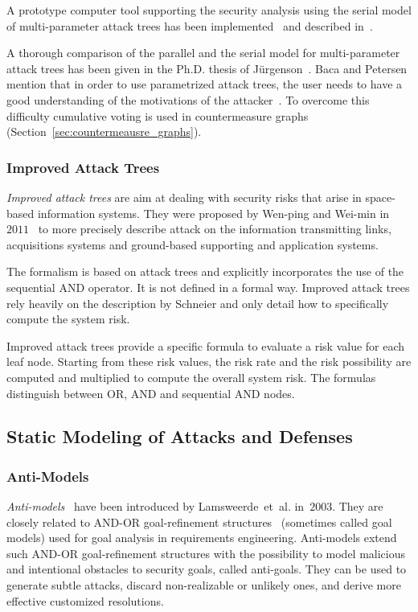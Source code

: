 \documentclass[a4paper]{article}
\begin{document}
A prototype computer tool supporting the security analysis using the serial
model of multi-parameter attack trees has been implemented~\cite{Program4} and
described in~\cite{AndrusenkoMaster}.

A thorough comparison of the parallel and the serial model for multi-parameter
attack trees has been given in the Ph.D. thesis of J\"{u}rgenson~\cite{Jurg}.
Baca and Petersen mention that in order to use parametrized attack trees, the 
user needs to have a good understanding of the motivations of the 
attacker~\cite{BaPe}. To overcome this difficulty cumulative voting is used in 
countermeasure graphs (Section~\ref{sec:countermeausre_graphs}).


\subsubsection{Improved Attack Trees} 
\label{sec:improved_attack_trees}

\emph{Improved attack trees} are aim at dealing with security risks that arise
in space-based information systems. They were proposed by Wen-ping and Wei-min
in~$2011$~\cite{WeWe} to more precisely describe attack on the information
transmitting links, acquisitions systems and ground-based supporting and
application systems.

The formalism is based on attack trees and explicitly incorporates the use of
the sequential AND operator. It is not defined in a formal way. Improved
attack trees rely heavily on the description by Schneier and only
detail how to specifically compute the system risk.

Improved attack trees provide a specific formula to evaluate a risk value for
each leaf node. Starting from these risk values, the risk rate and the risk
possibility are computed and multiplied to compute the overall system risk.
The formulas distinguish between OR, AND and sequential AND nodes.

\subsection{Static Modeling of Attacks and Defenses}
\label{sec:both_static}

\subsubsection{Anti-Models} 
\label{sec:obstacle_trees}

\emph{Anti-models}~\cite{LaBrLaJa} have been introduced by Lamsweerde~et~al.
in~$2003$. They are closely related to AND-OR goal-refinement 
structures~\cite{LaLe} (sometimes called goal models) used for goal analysis in
requirements engineering. Anti-models extend such AND-OR goal-refinement
structures with the possibility to model malicious and intentional obstacles to
security goals, called anti-goals. They can be used to generate subtle attacks,
discard non-realizable or unlikely ones, and derive more effective customized
resolutions.
\end{document}
